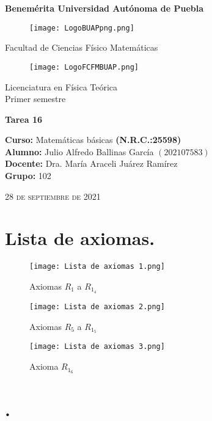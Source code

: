 \documentclass[12pt]{article}
\begin{document}
\thispagestyle{empty} 
\begin{center} \LARGE{\bf Benemérita Universidad Autónoma de Puebla} \\[0.5cm]
\begin{figure}[htb] \centering \texttt{[image: LogoBUAPpng.png]} \end{figure}
\LARGE{Facultad de Ciencias Físico Matemáticas}\\[0.5cm]
\begin{figure}[htb] \centering \texttt{[image: LogoFCFMBUAP.png]} \end{figure} 
\Large{Licenciatura en Física Teórica}\\[0.5cm]
\large{Primer semestre} \end{center}
\begin{center} { \Large \bfseries{Tarea 16}} \\ \end{center}
\large{\bf Curso:} Matemáticas básicas \textbf{(N.R.C.:25598)}\\
\large{\bf Alumno:} Julio Alfredo Ballinas García $\left(202107583\right)$ \\
\large{\bf Docente:} Dra. María Araceli Juárez Ramírez\\
\large{\bf Grupo:} 102\\ \begin{center} 
\vfill
\textsc{28 de septiembre de 2021} \end{center}  
\newpage
\sffamily
\section*{Lista de axiomas.}

\begin{figure}[htb] \centering \texttt{[image: Lista de axiomas 1.png]} 
\caption{Axiomas $R_1$ a $R_1_4$}
\end{figure} 
\newpage
\begin{figure}[htb] \centering \texttt{[image: Lista de axiomas 2.png]} 
\caption{Axiomas $R_5$ a $R_1_5$}
\end{figure} 
\newpage
\begin{figure}[htb] \centering \texttt{[image: Lista de axiomas 3.png]} 
\caption{Axioma $R_1_6$}
\end{figure} 

\vspace{1cm}

\section*{ . }\\
\end{document}
